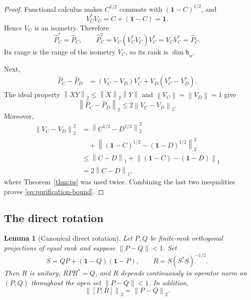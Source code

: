 \documentclass[11pt]{article}
\newtheorem{lemma}[theorem]{Lemma}
\theoremstyle{remark}
\newcommand{\id}{\mathbf 1}
\newcommand{\norm}[1]{\left\lVert #1\right\rVert}
\begin{document}
\begin{proof}
Functional calculus makes $C^{1/2}$ commute with
$(\id-C)^{1/2}$, and
\[
 V_C^*V_C=C+(\id-C)=\id.
\]
Hence $V_C$ is an isometry.  Therefore
\[
 \widehat P_C^*=\widehat P_C,\qquad
 \widehat P_C^2
 =V_C(V_C^*V_C)V_C^*
 =V_CV_C^*=\widehat P_C.
\]
Its range is the range of the isometry $V_C$, so its rank is
$\dim\mathfrak h_w$.

Next,
\[
\begin{aligned}
\widehat P_C-\widehat P_D
 &=(V_C-V_D)V_C^*+V_D(V_C^*-V_D^*).
\end{aligned}
\]
The ideal property
$\norm{XY}_2\le\norm{X}_2\norm{Y}$ and
$\norm{V_C}=\norm{V_D}=1$ give
\[
 \norm{\widehat P_C-\widehat P_D}_2
 \le 2\norm{V_C-V_D}_2.
\]
Moreover,
\[
\begin{aligned}
\norm{V_C-V_D}_2^2
 &=
 \norm{C^{1/2}-D^{1/2}}_2^2\\
 &\quad+
 \norm{(\id-C)^{1/2}-(\id-D)^{1/2}}_2^2\\
 &\le \norm{C-D}_1+\norm{(\id-C)-(\id-D)}_1\\
 &=2\norm{C-D}_1,
\end{aligned}
\]
where Theorem~\ref{thm:ps} was used twice.  Combining the last two
inequalities proves \eqref{eq:purification-bound}.
\end{proof}

\subsection{The direct rotation}

\begin{lemma}[Canonical direct rotation]\label{lem:rotation}
Let $P,Q$ be finite-rank orthogonal projections of equal rank and suppose
$\norm{P-Q}<1$.  Set
\[
 S=QP+(\id-Q)(\id-P),\qquad
 R=S(S^*S)^{-1/2}.
\tag{3.2}\label{eq:direct-rotation}
\]
Then $R$ is unitary, $RPR^*=Q$, and $R$ depends continuously in operator
norm on $(P,Q)$ throughout the open set $\norm{P-Q}<1$.  In addition,
\[
 \norm{[P,R]}_2=\norm{P-Q}_2.
\tag{3.3}\label{eq:shale-equality}
\]
\end{lemma}
\end{document}
